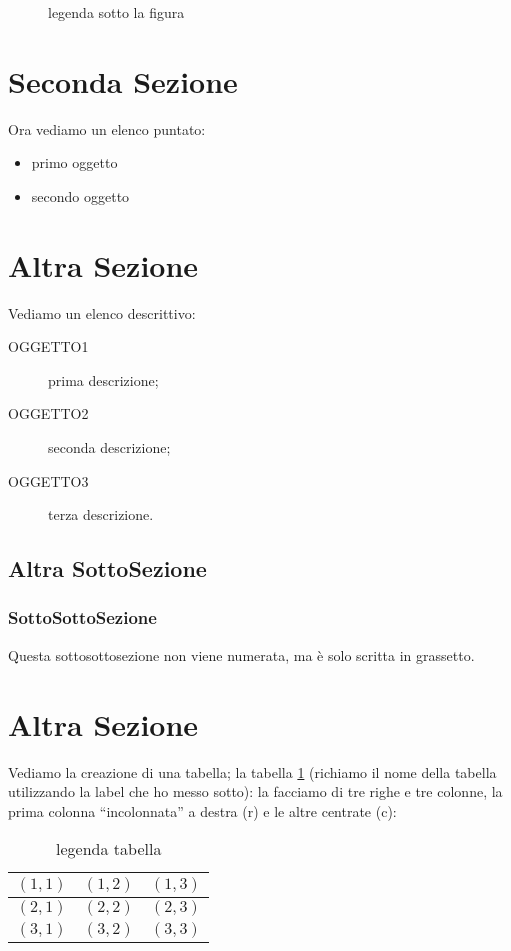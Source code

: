 \documentclass[12pt,a4paper,openright,twoside]{report}
\begin{document}
\begin{figure}[h]
\begin{center}
\caption[legenda elenco figure]{legenda sotto la figura}\label{fig:prima}
\end{center}
\end{figure}

\section{Seconda Sezione}
Ora vediamo un elenco puntato:
\begin{itemize}
\item primo oggetto
\item secondo oggetto
\end{itemize}

\section{Altra Sezione}
Vediamo un elenco descrittivo:
\begin{description}
  \item[OGGETTO1] prima descrizione;
  \item[OGGETTO2] seconda descrizione;
  \item[OGGETTO3] terza descrizione.
\end{description}

\subsection{Altra SottoSezione}
\subsubsection{SottoSottoSezione}Questa sottosottosezione non viene
numerata, ma \`e solo scritta in grassetto.
\section{Altra Sezione}
Vediamo la creazione di una tabella; la tabella \ref{tab:uno}
(richiamo il nome della tabella utilizzando la label che ho messo sotto):
la facciamo di tre righe e tre colonne, la prima colonna
``incolonnata'' a destra (r) e le altre centrate (c):\\
\begin{table}[h]

\begin{center}
\begin{tabular}{r|c|c}

\hline \hline
$(1,1)$ & $(1,2)$ & $(1,3)$\\
\hline
$(2,1)$ & $(2,2)$ & $(2,3)$\\
\hline
$(3,1)$ & $(3,2)$ & $(3,3)$\\
\hline \hline
\end{tabular}
\caption[legenda elenco tabelle]{legenda tabella}\label{tab:uno}
\end{center}
\end{table}
\end{document}
